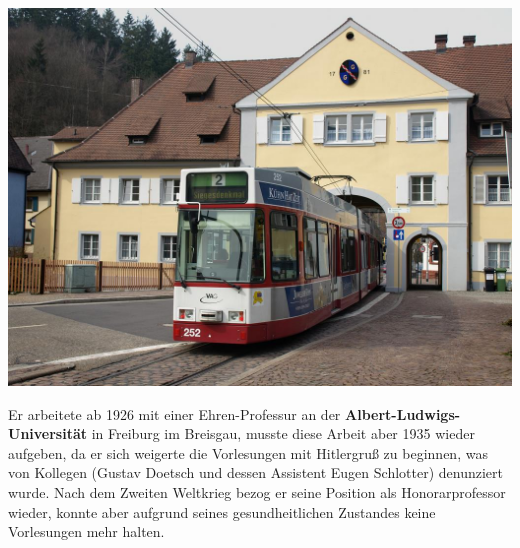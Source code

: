\documentclass[landscape, a4paper]{article}
\newcommand\alert[1]{\textcolor{PrimaryColor}{\textbf{#1}}}
\begin{document}
\begin{minipage}[t]{0.31\textwidth}
	\includegraphics[width=\linewidth]{./figures/tor.png}
	\setlength{\parskip}{0.25cm}

	Er arbeitete ab 1926 mit einer Ehren-Professur an der \alert{Albert-Ludwigs-Universität} in Freiburg im Breisgau, musste diese Arbeit aber 1935 wieder aufgeben, da er sich weigerte die Vorlesungen mit Hitlergruß zu beginnen, was von Kollegen (Gustav Doetsch und dessen Assistent Eugen Schlotter) denunziert wurde. Nach dem Zweiten Weltkrieg bezog er seine Position als Honorarprofessor wieder, konnte aber aufgrund seines gesundheitlichen Zustandes keine Vorlesungen mehr halten.
\end{minipage}%
\newpage
\end{document}
